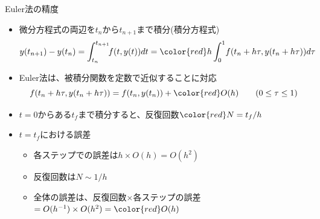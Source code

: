 \begin{frame}[t,fragile]{Euler法の精度}
  \begin{itemize}
  \item 微分方程式の両辺を$t_n$から$t_{n+1}$まで積分(積分方程式)
    \[
    y(t_{n+1}) - y(t_n) = \int^{t_{n+1}}_{t_n} \!\! f(t, y(t)) dt = {\color{red} h} \int^1_0 \! f(t_n+h\tau, y(t_n+h\tau)) d\tau
    \]
  \item Euler法は、被積分関数を定数で近似することに対応
    \[
    f(t_n+h\tau, y(t_n+h\tau)) = f(t_n, y(t_n)) + {\color{red} O(h)} \qquad (0 \leq \tau \leq 1)
    \]
  \item $t=0$からある$t_f$まで積分すると、反復回数${\color{red} N = t_f / h}$
  \item $t=t_f$における誤差
    \begin{itemize}
    \item 各ステップでの誤差は$h \times O(h) = O(h^2)$
    \item 反復回数は$N \sim 1 / h$
    \item 全体の誤差は、反復回数$\times$各ステップの誤差 $= O(h^{-1}) \times O(h^2) = {\color{red} O(h)}$
    \end{itemize}
  \end{itemize}
\end{frame}
